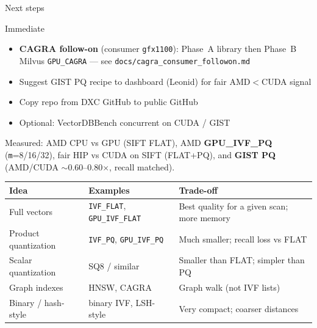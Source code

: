 \documentclass[aspectratio=169,11pt]{beamer}
\begin{document}
\begin{frame}{Next steps}
  \begin{block}{Immediate}
    \begin{itemize}
      \item \textbf{CAGRA follow-on} (consumer \texttt{gfx1100}): Phase~A library
            then Phase~B Milvus \texttt{GPU\_CAGRA} --- see
            \texttt{docs/cagra\_consumer\_followon.md}
      \item Suggest GIST PQ recipe to dashboard (Leonid) for fair AMD$<$CUDA signal
      \item Copy repo from DXC GitHub to public GitHub
      \item Optional: VectorDBBench concurrent on CUDA / GIST
    \end{itemize}
  \end{block}

  \footnotesize
  Measured: AMD CPU vs GPU (SIFT FLAT), AMD \textbf{GPU\_IVF\_PQ} (\texttt{m}=8/16/32),
  fair HIP vs CUDA on SIFT (FLAT+PQ), and \textbf{GIST PQ}
  (AMD/CUDA $\sim$0.60--0.80$\times$, recall matched).\\[0.3em]

  \begin{center}
  \begin{tabular}{@{}lll@{}}
    \toprule
    \textbf{Idea} & \textbf{Examples} & \textbf{Trade-off} \\
    \midrule
    Full vectors
      & \texttt{IVF\_FLAT}, \texttt{GPU\_IVF\_FLAT}
      & Best quality for a given scan; more memory \\
    Product quantization
      & \texttt{IVF\_PQ}, \texttt{GPU\_IVF\_PQ}
      & Much smaller; recall loss vs FLAT \\
    Scalar quantization
      & SQ8 / similar
      & Smaller than FLAT; simpler than PQ \\
    Graph indexes
      & HNSW, CAGRA
      & Graph walk (not IVF lists) \\
    Binary / hash-style
      & binary IVF, LSH-style
      & Very compact; coarser distances \\
    \bottomrule
  \end{tabular}
  \end{center}
\end{frame}
\end{document}
